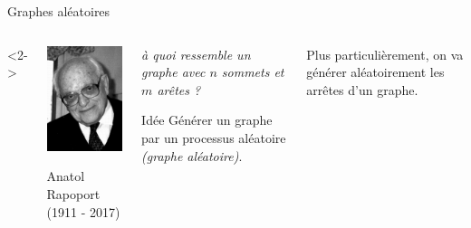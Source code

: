 \documentclass[french,bookmarks]{beamer}
\begin{document}
\begin{frame}{Graphes aléatoires}
    \begin{columns}
        <2->
        \begin{center}
            \includegraphics[scale=0.2]{MPI - Maths/Expose/images/Anatol_Rapoport.jpg}
        
            Anatol Rapoport (1911 - 2017)
        \end{center}
        
        \begin{center}
            \emph{à quoi ressemble un graphe  avec $n$ sommets et $m$ arêtes ? }\pause
            
            \begin{bform}{Idée}{}
                    Générer un graphe par un processus aléatoire \emph{(graphe aléatoire)}.
            \end{bform}
        \end{center}\pause
        
        \begin{enumerate}
            \itt Plus particulièrement, on va générer aléatoirement les arrêtes d'un graphe.
        \end{enumerate}
    \end{columns}
\end{frame}
\end{document}
